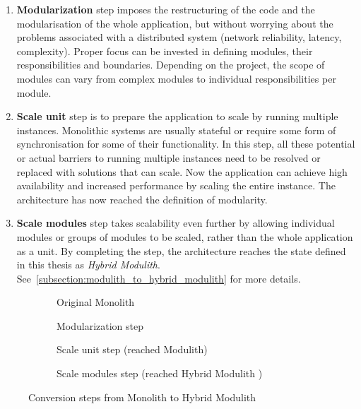 \begin{enumerate}
    \item \textbf{Modularization} step imposes the restructuring of the code and the modularisation of the whole application, but without worrying about the problems associated with a distributed system (network reliability, latency, complexity). Proper focus can be invested in defining modules, their responsibilities and boundaries. Depending on the project, the scope of modules can vary from complex modules to individual responsibilities per module.
    \item \textbf{Scale unit} step is to prepare the application to scale by running multiple instances. Monolithic systems are usually stateful or require some form of synchronisation for some of their functionality. In this step, all these potential or actual barriers to running multiple instances need to be resolved or replaced with solutions that can scale. Now the application can achieve high availability and increased performance by scaling the entire instance. The architecture has now reached the definition of modularity.
    \item \textbf{Scale modules} step takes scalability even further by allowing individual modules or groups of modules to be scaled, rather than the whole application as a unit. By completing the step, the architecture reaches the state defined in this thesis as \textit{Hybrid Modulith}. See~\ref{subsection:modulith_to_hybrid_modulith} for more details.
\end{enumerate}

\begin{figure}
    \centering
    \begin{subfigure}{.5\textwidth}
        \centering
        
        \caption{Original Monolith}
    \end{subfigure}%
    \begin{subfigure}{.5\textwidth}
        \centering
        
        \caption{Modularization step}
    \end{subfigure}
    \begin{subfigure}{\textwidth}
        \centering
        
        \caption{Scale unit step (reached Modulith)\label{fig:scale_as_unit}}
    \end{subfigure}%
    \hfill
    \begin{subfigure}{\textwidth}
        \centering
        
        \caption{Scale modules step (reached Hybrid Modulith \label{fig:hybrid_modulith})}
    \end{subfigure}
    \caption{Conversion steps from Monolith to Hybrid Modulith}
    \label{fig:monolith_to_modulith_steps}
\end{figure}


